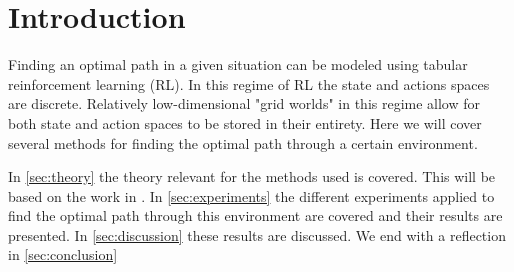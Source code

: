 \documentclass{article}
\theoremstyle{plain}
\theoremstyle{definition}
\theoremstyle{remark}
\begin{document}
\newpage
\begin{abstract}

This article is about implementing Reinforcement Learning various algorithms on a grid world problem with stochastic factors. The algorithms are run in enough explained iterations to use the previous learnings, to be able to converge to the terminal state in less steps. Every algorithm is also run multiple times to generate more results so as to be more reliably comparable with the other algorithms. The approaches and algorithms included are "\textbf{Dynamic Programming}", "\textbf{Exploration Techniques}", "\textbf{On-policy versus Off-policy}", "\textbf{Depth of Target}".
\end{abstract}

\section{Introduction} \label{sec:introduction}
Finding an optimal path in a given situation can be modeled using tabular reinforcement learning (RL). In this regime of RL the state and actions spaces are discrete. Relatively low-dimensional "grid worlds" in this regime allow for both state and action spaces to be stored in their entirety. Here we will cover several methods for finding the optimal path through a certain environment.  

In \autoref{sec:theory} the theory relevant for the methods used is covered. This will be based on the work in \cite{RL_book}.
In \autoref{sec:experiments} the different experiments applied to find the optimal path through this environment are covered and their results are presented. In \autoref{sec:discussion} these results are discussed. We end with a reflection in \autoref{sec:conclusion}
\end{document}
